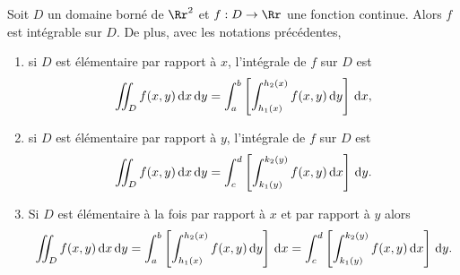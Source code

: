 \documentclass[class=report,crop=false]{standalone}
\begin{document}
%

\begin{theoreme}Soit $D$ un domaine borné de $\Rr^2$ et $f:D\to \Rr$ une fonction continue. Alors $f$ est intégrable sur $D$. De plus, avec les notations précédentes,
\begin{enumerate}
\item si $D$ est élémentaire par rapport à $x$, l'intégrale de $f$ sur $D$ est
$$\int \!\!\!\!\int _Df(x,y)\,\mathrm{d} x\,\mathrm{d} y =\int_a^b\left[\int _{h_1 (x)}^{h_2 (x)}f(x,y)\,\mathrm{d} y\right]\,\mathrm{d} x,$$
\item si $D$ est élémentaire par rapport à $y$, l'intégrale de $f$ sur $D$ est
$$\int \!\!\!\!\int _Df(x,y)\,\mathrm{d} x\,\mathrm{d} y =\int_c^d\left[\int _{k_1 (y)}^{k_2 (y)}f(x,y)\,\mathrm{d} x\right]\,\mathrm{d} y.$$
\item Si $D$ est élémentaire à la fois par rapport à $x$ et par rapport à $y$ alors
$$\int \!\!\!\!\int _Df(x,y)\,\mathrm{d} x\,\mathrm{d} y =\int_a^b\left[\int _{h_1 (x)}^{h_2 (x)}f(x,y)\,\mathrm{d} y\right]\,\mathrm{d} x=\int_c^d\left[\int _{k_1 (y)}^{k_2 (y)}f(x,y)\,\mathrm{d} x\right]\,\mathrm{d} y.$$
\end{enumerate} 
\end{theoreme}
\end{document}

